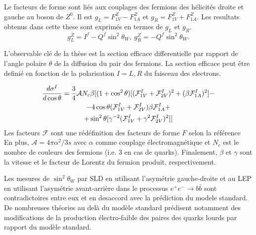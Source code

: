 Le facteurs de forme sont liés aux couplages des fermions des hélicités droite et gauche au boson de $Z^0$. Il est $g_L = F^Z_{1V} - F^Z_{1A}$  et $g_R = F^Z_{1V} + F^Z_{1A}$.
Les resultats obtenus dans cette these sont exprimés en termes de $g_L$ et $g_R$.  
\begin{equation}
g_L^Z = I^f - Q^f\sin^2\theta_W, \  g_R^Z = -Q^f\sin^2\theta_W.
\label{formula:EWcouplings_3F}
\end{equation}

L'observable clé de la thèse est la section efficace differentielle par rapport de l'angle polaire $\theta$ de la diffusion du pair des fermions. La section efficace peut être definié en fonction de la polarisation $I=L, R$ du faisceau des electrons.    

\begin{multline}
\label{formula:DiffSigma_3F}
\frac{d\sigma^I}{d\cos\theta} = \frac{3}{4} \mathcal{A} N_c \beta[ (1+\cos^2\theta) [(\mathcal{F}^I_{1V}+\mathcal{F}^I_{2V})^2+(\beta \mathcal{F}^I_{1A})^2] - \\-4 \cos\theta (\mathcal{F}^I_{1V}+\mathcal{F}^I_{2V})\beta \mathcal{F}^I_{1A} +\\+ \sin^2\theta [\gamma ^{-2} (\mathcal{F}^I_{1V} +\gamma^2 \mathcal{F}^I_{2V})^2] ]
\end{multline}
Les facteurs $\mathcal{F}$ sont une rédéfinition des facteurs de forme $F$ selon la référence~\cite{bib:Schmidt}
En plus, $\mathcal{A} = 4\pi\alpha^2/3s$ avec $\alpha$ comme couplage électromagnétique et $N_c$ est le nombre de couleurs des fermions (i.e. 3 en cas de quarks). Finalement, $\beta$ et $\gamma$ sont la vitesse et le facteur de Lorentz du fermion produit, respectivement.

Les mesures de $\sin^2\theta_W$ par SLD en utilisant l'asymétrie gauche-droite et au LEP en utilisant l'asymétrie avant-arrière dans le processus $e^+e^-\to b\bar{b}$ sont contradictoires entre eux et en desaccord avec la prédiction du modele standard.  
De nombreuses théories au delà du modèle standard prédisent notamment des modifications de la production électro-faible des paires des quarks lourds par rapport du modèle standard.
\newpage
